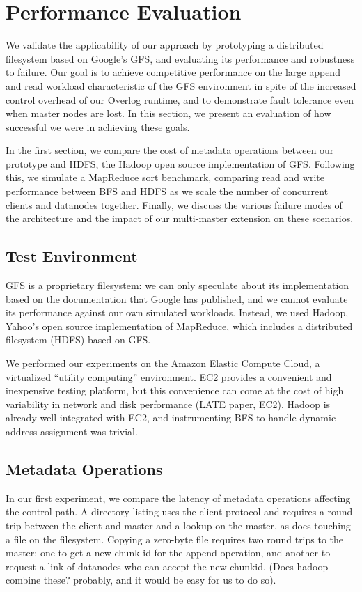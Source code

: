 \documentclass{article}
\begin{document}
\section{Performance Evaluation}
\label{perf-eval}
We  validate the applicability of our approach by prototyping a distributed filesystem based on Google's GFS, and evaluating its performance and robustness to failure.  Our goal is to achieve competitive performance on the large append and read workload characteristic of the GFS environment in spite of the increased control overhead of our Overlog runtime, and to demonstrate fault tolerance even when master nodes are lost.  In this section, we present an evaluation of how successful we were in achieving these goals.

In the first section, we compare the cost of metadata operations between our prototype and HDFS, the Hadoop open source implementation of GFS.  Following this, we simulate a MapReduce sort benchmark, comparing read and write performance between BFS and HDFS as we 
scale the number of concurrent clients and datanodes together.  Finally, we discuss the various failure modes of the architecture and the impact of our multi-master extension on these scenarios.

\subsection{Test Environment}
GFS is a proprietary filesystem: we can only speculate about its implementation based on the documentation that Google has published, and we cannot evaluate its performance against our own simulated workloads.  Instead, we used Hadoop, Yahoo's open source implementation of MapReduce, which includes a distributed filesystem (HDFS) based on GFS.

We performed our experiments on the Amazon Elastic Compute Cloud, a virtualized ``utility computing'' environment.  EC2 provides a convenient and inexpensive testing platform, but this convenience can come at the cost of high variability in network and disk performance (LATE paper, EC2).  Hadoop is already well-integrated with EC2, and instrumenting BFS to handle dynamic address assignment was trivial.

\subsection{Metadata Operations}
In our first experiment, we compare the latency of metadata operations affecting the control path.  A directory listing uses the client protocol and requires a round trip between the client and master and a lookup on the master, as does touching a file on the filesystem.  Copying a zero-byte file requires two round trips to the master: one to get a new chunk id for the append operation, and another to request a link of datanodes who can accept the new chunkid.  (Does hadoop combine these?  probably, and it would be easy for us to do so).
\end{document}
